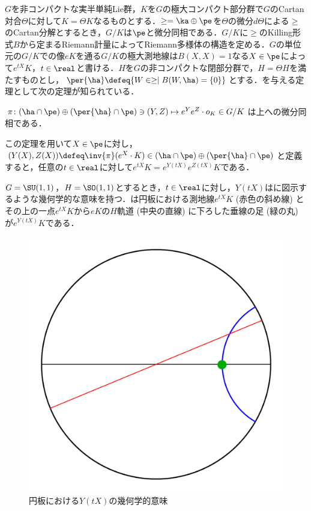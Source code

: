 $G$を非コンパクトな実半単純Lie群，$K$を$G$の極大コンパクト部分群で$G$のCartan対合$\Theta$に対して$K = \Theta K $なるものとする．$\ge = \ka \oplus \pe $を$\Theta$の微分$d\Theta$による$\ge$のCartan分解とするとき，$G/K$は$\pe$と微分同相である．$G/K$に$\ge$のKilling形式$B$から定まるRiemann計量によってRiemann多様体の構造を定める．$G$の単位元の$G/K$での像$eK$を通る$G/K$の極大測地線は$B(X, X) = 1 $なる$X\in \pe$によって$e^{tX}K $，$t\in \real$と書ける．$H$を$G$の非コンパクトな閉部分群で，$H = \Theta H$を満たすものとし，$\per{\ha}\defeq \{W\in \ge\mid B(W, \ha) = \{0\} \} $とする．を与える定理として次の定理が知られている．

\begin{thm*}\cite[Lemma~6.1]{kob89}\label{thm:kob89-lem6.1}
  $\pi\colon  (\ha\cap\pe)\oplus (\per{\ha}\cap \pe) \ni (Y, Z)\mapsto e^{Y}e^{Z}\cdot o_K \in G/K $は上への微分同相である．
\end{thm*}
この定理を用いて$X\in \pe$に対し，$(Y(X), Z(X))\defeq \inv{\pi}(e^X\cdot K)\in (\ha\cap\pe)\oplus (\per{\ha}\cap \pe)$と定義すると，任意の$t\in \real$に対して$e^{tX}K = e^{Y(tX)}e^{Z(tX)}K $である．

$G = \SU(1,1) $，$H = \SO(1,1) $とするとき，$t\in \real$に対し，$Y(tX) $はに図示するような幾何学的な意味を持つ．は{\Poincare}円板における測地線$e^{tX}K$ (赤色の斜め線) とその上の一点$e^{tX}K$から$eK$の$H$軌道 (中央の直線) に下ろした垂線の足 (緑の丸) が$e^{Y(tX)}K $である．
\begin{figure}[H]
  \centering
  \includegraphics[scale=0.3]{../graph/y-and-z.pdf}
  \caption{{\Poincare}円板における$Y(tX) $の幾何学的意味}
  \label{fig:y-and-z}
\end{figure}

